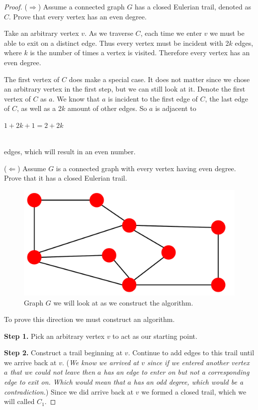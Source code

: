 \documentclass[10pt]{amsart}
\begin{document}
\begin{proof} 
    ($\Rightarrow$) Assume a connected graph $G$ has a closed Eulerian trail, denoted as $C$. Prove that
    every vertex has an even degree. 
    
    \noindent
    Take an arbitrary vertex $v$. As we traverse $C$, each time we enter $v$ we must be able to exit on a
    distinct edge. Thus every vertex must be incident with 2$k$ edges, where $k$ is the number of times
    a vertex is visited. Therefore every vertex has an even degree. 

    \noindent
    The first vertex of $C$ does make a special case. It does not matter since we chose an arbitrary
    vertex in the first step, but we can still look at it. Denote the first vertex of $C$ as $a$. We
    know that $a$ is incident to the first edge of $C$, the last edge of $C$, as well as a 2$k$ amount
    of other edges. So $a$ is adjacent to \\
    \centerline{$1+2k+1 = 2+2k$} \\
    edges, which will result in an even number.

    \noindent
    ($\Leftarrow$) Assume $G$ is a connected graph with every vertex having even degree. Prove that
    it has a closed Eulerian trail.

    \begin{figure}[h!]
        \centerline{
        {\includegraphics[width=.45\textwidth]{pictures/G.pdf}}}
        \caption{Graph $G$ we will look at as we construct the algorithm.}\label{G}
    \end{figure} 

    \noindent
    To prove this direction we must construct an algorithm. 
    
    \noindent
    \textbf{Step 1.} Pick an arbitrary vertex $v$ to act as our starting point.

    \noindent
    \textbf{Step 2.} Construct a trail beginning at $v$. Continue to add edges to this trail until we
    arrive back at $v$. (\emph{We know we arrived at $v$ since if we entered another vertex $a$ that we
    could not leave then $a$ has an edge to enter on but not a corresponding edge to exit on. Which would
    mean that $a$ has an odd degree, which would be a contradiction.}) Since we did arrive back at
    $v$ we formed a closed trail, which we will called $C_1$.


\end{proof}
\end{document}
